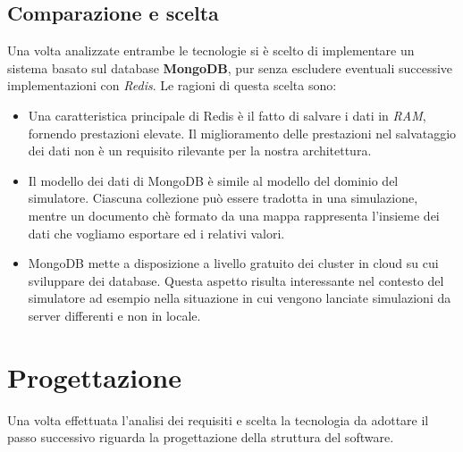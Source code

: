 \documentclass[12pt,a4paper,openright,oneside]{book}
\begin{document}
\subsection{Comparazione e scelta}
Una volta analizzate entrambe le tecnologie si è scelto di implementare un sistema basato sul database \textbf{MongoDB}, pur senza escludere eventuali successive implementazioni con \textit{Redis}.
Le ragioni di questa scelta sono:
\begin{itemize}
    \item Una caratteristica principale di Redis è il fatto di salvare i dati in \textit{RAM}, fornendo prestazioni elevate.
    Il miglioramento delle prestazioni nel salvataggio dei dati non è un requisito rilevante per la nostra architettura.
    \item Il modello dei dati di MongoDB è simile al modello del dominio del simulatore. Ciascuna collezione può essere tradotta in una simulazione, mentre un documento chè formato da una mappa rappresenta l'insieme dei dati che vogliamo esportare ed i relativi valori.
    \item MongoDB mette a disposizione a livello gratuito dei cluster in cloud su cui sviluppare dei database. Questa aspetto risulta interessante nel contesto del simulatore ad esempio nella situazione in cui vengono lanciate simulazioni da server differenti e non in locale.
\end{itemize}
\section{Progettazione}
Una volta effettuata l'analisi dei requisiti e scelta la tecnologia da adottare il passo successivo riguarda la progettazione della struttura del software.
\end{document}
